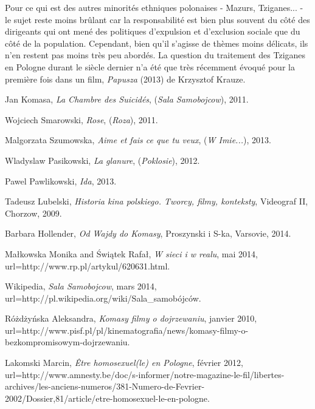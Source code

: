 \documentclass[12pt]{amsart}
\begin{document}
\begin{multicols}{2}
Pour ce qui est des autres minorités ethniques polonaises - Mazurs, Tziganes... - le sujet reste moins brûlant car la responsabilité est bien plus souvent du côté des dirigeants qui ont mené des politiques d'expulsion et d'exclusion sociale que du côté de la population. Cependant, bien qu'il s'agisse de thèmes moins délicats, ils n'en restent pas moins très peu abordés. La question du traitement des Tziganes en Pologne durant le siècle dernier n'a été que très récemment évoqué pour la première fois dans un film, \emph{Papusza} (2013) de Krzysztof Krauze. 

\cleardoublepage

\end{multicols}

\onecolumn
\begin{thebibliography}{100}

	Jan Komasa,
	\emph{La Chambre des Suicidés},
	(\emph{Sala Samobojcow}),
	2011.
	
	Wojciech Smarowski,
	\emph{Rose},
	(\emph{Roza}),
	2011.
	
	Malgorzata Szumowska,
	\emph{Aime et fais ce que tu veux},
	(\emph{W Imie...}),
	2013.
	
	Wladyslaw Pasikowski,
	\emph{La glanure},
	(\emph{Poklosie}),
	2012.
	
	Pawel Pawlikowski,
	\emph{Ida},
	2013.

	Tadeusz Lubelski, 
	\emph{Historia kina polskiego. Tworcy, filmy, konteksty},
	Videograf II,
	Chorzow,
	2009.
	 
	Barbara Hollender,
	\emph{Od Wajdy do Komasy},
	Proszynski i S-ka,
	Varsovie,
	2014.
	
	Małkowska Monika and Świątek Rafał,
	\emph{W sieci i w realu},
	mai 2014,
	url=http://www.rp.pl/artykul/620631.html.

	Wikipedia,
	\emph{Sala Samobojcow},
	mars 2014,
	url=http://pl.wikipedia.org/wiki/Sala\_samobójców.


	Różdżyńska Aleksandra,
	\emph{Komasy filmy o dojrzewaniu},
	janvier 2010,
	url=http://www.pisf.pl/pl/kinematografia/news/komasy-filmy-o-bezkompromisowym-dojrzewaniu.


	Lakomski Marcin,
	\emph{Être homosexuel(le) en Pologne},
	février 2012,
	url=http://www.amnesty.be/doc/s-informer/notre-magazine-le-fil/libertes-archives/les-anciens-numeros/381-Numero-de-Fevrier-2002/Dossier,81/article/etre-homosexuel-le-en-pologne.


\end{thebibliography}
\end{document}
